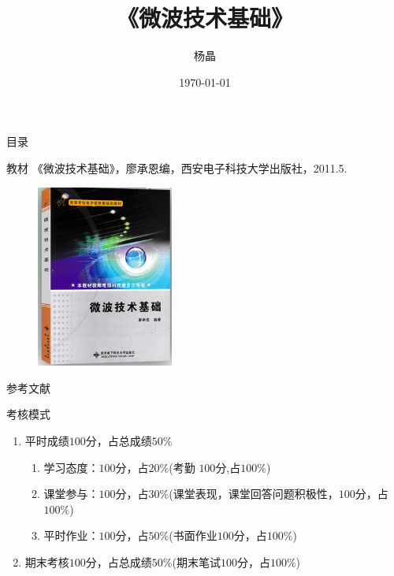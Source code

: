\documentclass{ctexbeamer}
\begin{document}
  \begin{frame}
    \title{《微波技术基础》}
    \author{杨晶}
    \date{\today}
    \titlepage
  \end{frame}

  \begin{frame}{目录}
    \tableofcontents
  \end{frame}

  \begin{frame}{教材}
   《微波技术基础》，廖承恩编，西安电子科技大学出版社，2011.5.
   \begin{figure}
    \centering
    \includegraphics[height=6cm]{jiaocai2}
   \end{figure}
  \end{frame}

  \begin{frame}{参考文献}
   
   \nocite{Zhao}
   \nocite{Wu}
   \nocite{Colin}
   \nocite{Liang}
   
  \end{frame}

  \begin{frame}{考核模式}
   \begin{enumerate}
    \item 平时成绩$100$分，占总成绩$50\%$
          \begin{enumerate}
           \item 学习态度：$100$分，占$20\%$(考勤 $100$分,占$100\%$)
           \item 课堂参与：$100$分，占$30\%$(课堂表现，课堂回答问题积极性，$100$分，占$100\%$)
           \item 平时作业：$100$分，占$50\%$(书面作业$100$分，占$100\%$)
          \end{enumerate}
    \item 期末考核$100$分，占总成绩$50\%$(期末笔试$100$分，占$100\%$)
   \end{enumerate}
  \end{frame}
\end{document}
